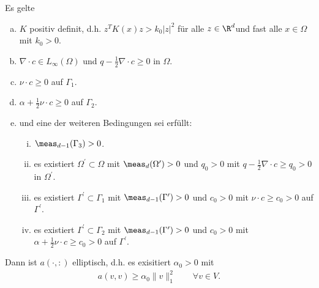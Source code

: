 \begin{Satz}
    \label{satz:3.24}
    Es gelte
    \begin{enumerate}[a)]
      \item
        $K$ positiv definit, d.h. $z^T K(x) z > k_0 |z|^2$ für alle $z\in
        \R^d$und fast alle $x\in \Omega$ mit $k_0 > 0$.
      \item
        $\nabla \cdot c \in L_\infty(\Omega)$ und $q - \frac{1}{2} \nabla \cdot
        c \ge 0$ in $\Omega$.
      \item
        $\nu \cdot c \ge 0$ auf $\Gamma_1$.
      \item
        $\alpha + \frac{1}{2} \nu \cdot c \ge 0$ auf $\Gamma_2$.
      \item
        und eine der weiteren Bedingungen sei erfüllt:
        \begin{enumerate}[i)]
          \item
            $\meas_{d-1}(\Gamma_3) > 0$.
          \item
            es existiert $\Omega^\prime \subset \Omega$ mit $\meas_{d}
            (\Omega^\prime) > 0$ und $q_0 > 0$ mit $q - \frac{1}{2} \nabla \cdot
            c \ge q_0 > 0$ in $\Omega^\prime$.
          \item
            es existiert $\Gamma^\prime \subset \Gamma_1$ mit $\meas_{d-1}
            (\Gamma^\prime) > 0$ und $c_0 > 0$ mit $\nu \cdot c \ge c_0 > 0$ auf
            $\Gamma^\prime$.
          \item
            es existiert $\Gamma^\prime \subset \Gamma_2$ mit $\meas_{d-1}
            (\Gamma^\prime) > 0$ und $c_0 >0$ mit $\alpha + \frac{1}{2} \nu
            \cdot c \ge c_0 > 0$ auf $\Gamma^\prime$.
        \end{enumerate}
    \end{enumerate}
    Dann ist $a(\cdot, :)$ elliptisch, d.h. es exisitiert $\alpha_0 > 0$ mit
    \begin{eqnarray*}
        a(v, v) \ge \alpha_0 \|v\|_1^2 \qquad \forall v\in V.
    \end{eqnarray*}
\end{Satz}


